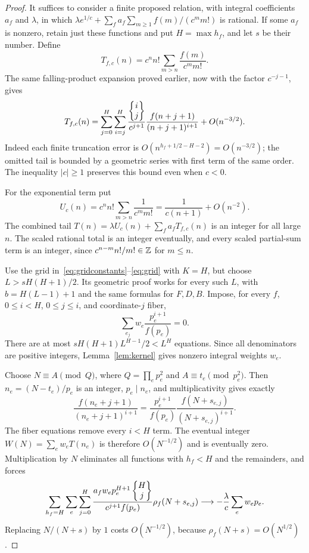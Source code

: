 \begin{proof}
It suffices to consider a finite proposed relation, with integral
coefficients $a_f$ and $\lambda$, in which
$\lambda e^{1/c}+\sum_f a_f\sum_{m\geq1}f(m)/(c^m m!)$ is rational.
If some $a_f$ is nonzero, retain just these functions and put
$H=\max h_f$, and let $s$ be their number. Define
\[
 T_{f,c}(n)=c^n n!\sum_{m>n}\frac{f(m)}{c^m m!}.
\]
The same falling-product expansion proved earlier, now with the
factor $c^{-j-1}$, gives
\begin{equation}\label{eq:generaltail}
 T_{f,c}(n)=\sum_{j=0}^H\sum_{i=j}^H
 \frac{\left\{\begin{matrix}i\\j\end{matrix}\right\}}{c^{j+1}}
 \frac{f(n+j+1)}{(n+j+1)^{i+1}}+O(n^{-3/2}).
\end{equation}
Indeed each finite truncation error is
$O(n^{h_f+1/2-H-2})=O(n^{-3/2})$; the omitted tail is bounded
by a geometric series with first term of the same order.
The inequality $|c|\geq1$ preserves this bound even when $c<0$.

For the exponential term put
\[
 U_c(n)=c^n n!\sum_{m>n}\frac1{c^m m!}
       =\frac1{c(n+1)}+O(n^{-2}).
\]
The combined tail $T(n)=\lambda U_c(n)+\sum_fa_fT_{f,c}(n)$
is an integer for all large $n$. The scaled rational total is an
integer eventually, and every scaled partial-sum term is an integer,
since $c^{n-m}n!/m!\in\mathbb Z$ for $m\leq n$.

Use the grid in~\eqref{eq:gridconstants}--\eqref{eq:grid} with
$K=H$, but choose $L>sH(H+1)/2$. Its geometric proof works for
every such $L$, with $b=H(L-1)+1$ and the same formulas for
$F,D,B$. Impose, for every $f$, $0\leq i<H$, $0\leq j\leq i$,
and coordinate-$j$ fiber,
\begin{equation}\label{eq:generalweights}
 \sum_{e_j}w_e\frac{p_e^{i+1}}{f(p_e)}=0.
\end{equation}
There are at most $sH(H+1)L^{H-1}/2<L^H$ equations. Since all
denominators are positive integers, Lemma~\ref{lem:kernel} gives
nonzero integral weights $w_e$.

Choose $N\equiv A\pmod Q$, where $Q=\prod_ep_e^2$ and
$A\equiv t_e\pmod{p_e^2}$. Then $n_e=(N-t_e)/p_e$ is an integer,
$p_e\mid n_e$, and multiplicativity gives exactly
\[
 \frac{f(n_e+j+1)}{(n_e+j+1)^{i+1}}
 =\frac{p_e^{i+1}}{f(p_e)}
   \frac{f(N+s_{e,j})}{(N+s_{e,j})^{i+1}}.
\]
The fiber equations remove every $i<H$ term. The eventual integer
$W(N)=\sum_ew_eT(n_e)$ is therefore $O(N^{-1/2})$ and is eventually
zero. Multiplication by $N$ eliminates all functions with $h_f<H$
and the remainders, and forces
\begin{equation}\label{eq:generallimit}
 \sum_{h_f=H}\sum_e\sum_{j=0}^H
 \frac{a_fw_ep_e^{H+1}\left\{\begin{matrix}H\\j\end{matrix}\right\}}{c^{j+1}f(p_e)}
       \rho_f(N+s_{e,j})
 \longrightarrow -\frac{\lambda}{c}\sum_ew_ep_e.
\end{equation}
Replacing $N/(N+s)$ by $1$ costs $O(N^{-1/2})$, because
$\rho_f(N+s)=O(N^{1/2})$.


\end{proof}
